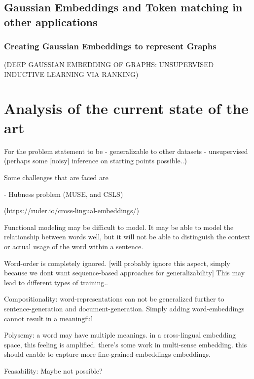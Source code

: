 \documentclass[a4paper,12pt,twoside,openright]{report}
\begin{document}
\section{Gaussian Embeddings and Token matching in other applications}

\subsection{Creating Gaussian Embeddings to represent Graphs}
(DEEP GAUSSIAN EMBEDDING OF GRAPHS: UNSUPERVISED INDUCTIVE LEARNING VIA RANKING)






\chapter{Analysis of the current state of the art}

For the problem statement to be
- generalizable to other datasets
- unsupervised (perhaps some [noisy] inference on starting points possible..)

Some challenges that are faced are

- Hubness problem (MUSE, and CSLS)

(https://ruder.io/cross-lingual-embeddings/)

Functional modeling may be difficult to model.
It may be able to model the relationship between words well, but it will not be able to distinguish the context or actual usage of the word within a sentence.

Word-order is completely ignored. [will probably ignore this aspect, simply because we dont want sequence-based approaches for generalizability]
This may lead to different types of training.. 

Compositionality:
word-representations can not be generalized further to sentence-generation and document-generation. 
Simply adding word-embeddings cannot result in a meaningful 

Polysemy:
a word may have multiple meanings.
in a cross-lingual embedding space, this feeling is amplified.
there's some work in multi-sense embedding.
this should enable to capture more fine-grained embeddings embeddings.

Feasability:
Maybe not possible?
\end{document}
